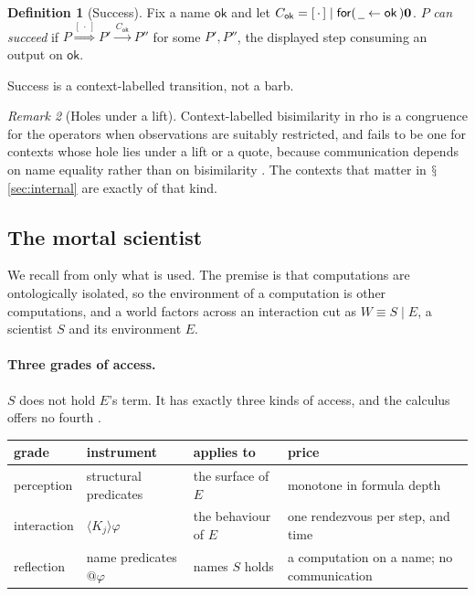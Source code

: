 \documentclass[11pt]{article}
\theoremstyle{definition}
\newtheorem{definition}{Definition}[section]
\theoremstyle{plain}
\theoremstyle{remark}
\newtheorem{remark}[definition]{Remark}
\newcommand{\inp}[3]{\mathsf{for}(\,#1 \leftarrow #2\,)#3}
\newcommand{\nil}{\mathbf{0}}
\newcommand{\wild}{\mathord{\underline{\hspace{0.5em}}}}
\DeclareRobustCommand{\S}{\ifmmode\mathsection\else$\mathsection$\fi}
\newcommand{\hole}{[\,\cdot\,]}
\newcommand{\ok}{\mathsf{ok}}
\newcommand{\Lab}[1]{\xrightarrow{\,#1\,}}
\newcommand{\WLab}[1]{\overset{#1}{\Longrightarrow}}
\begin{document}
\begin{definition}[Success]\label{def:success}
Fix a name $\ok$ and let $C_\ok = \hole \mid \inp{\wild}{\ok}{\nil}$.
$P$ \emph{can succeed} if $P \WLab{\hole} P' \Lab{C_\ok} P''$ for some
$P', P''$, the displayed step consuming an output on $\ok$.
\end{definition}

Success is a context-labelled transition, not a barb.

\begin{remark}[Holes under a lift]\label{rem:bihol}
Context-labelled bisimilarity in rho is a congruence for the operators
when observations are suitably restricted, and fails to be one for
contexts whose hole lies under a lift or a quote, because communication
depends on name equality rather than on bisimilarity \cite{BIHOL}. The contexts that
matter in \S\ref{sec:internal} are exactly of that kind.
\end{remark}

\subsection{The mortal scientist}\label{sec:mortal}

We recall from \cite{Scientist} only what is used. The premise is that
computations are ontologically isolated, so the environment of a
computation is other computations, and a world factors across an
interaction cut as $W \equiv S \mid E$, a scientist $S$ and its
environment $E$.

\paragraph{Three grades of access.} $S$ does not hold $E$'s term. It has
exactly three kinds of access, and the calculus offers no fourth
\cite[\S2.2]{Scientist}.

\begin{center}
\begin{tabular}{@{}lllp{}@{}}
\toprule
grade & instrument & applies to & price \\
\midrule
perception & structural predicates & the surface of $E$ &
monotone in formula depth \\
interaction & $\langle K_j \rangle \varphi$ & the behaviour of $E$ &
one rendezvous per step, and time \\
reflection & name predicates $@\varphi$ & names $S$ holds &
a computation on a name; no communication \\
\bottomrule
\end{tabular}
\end{center}
\end{document}
